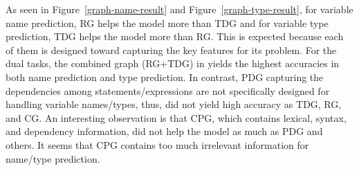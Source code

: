 As seen in Figure~\ref{graph-name-result} and
Figure~\ref{graph-type-result}, for variable name prediction, RG helps
the model more than TDG and for variable type prediction, TDG helps
the model more than RG. This is expected because each of them is
designed toward capturing the key features for its problem. For the
dual tasks, the combined graph (RG+TDG) in {\tool} yields the highest
accuracies in both name prediction and type prediction. In contrast,
PDG capturing the dependencies among statements/expressions are not
specifically designed for handling variable names/types, thus, did not
yield high accuracy as TDG, RG, and CG. An interesting observation is
that CPG, which contains lexical, syntax, and dependency information,
did not help the model as much as PDG and others. It seems that CPG
contains too much irrelevant information for name/type prediction.



